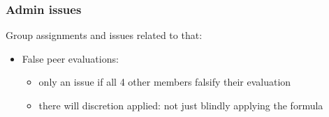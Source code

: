 \begin{frame}\frametitle{Admin issues}
	Group assignments and issues related to that:
	\begin{itemize}
		\item	False peer evaluations: 
		\begin{itemize}
			\item	only an issue if all 4 other members falsify their evaluation
			\item	there will discretion applied: not just blindly applying the formula
		\end{itemize}
	\end{itemize}
\end{frame}